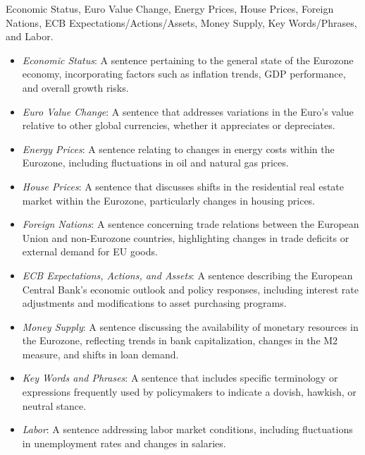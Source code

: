  Economic Status, Euro Value Change, Energy Prices, House Prices, Foreign Nations, ECB Expectations/Actions/Assets, Money Supply, Key Words/Phrases, and Labor.

\begin{itemize} 
    \item \emph{Economic Status}: A sentence pertaining to the general state of the Eurozone economy, incorporating factors such as inflation trends, GDP performance, and overall growth risks. 
    \item \emph{Euro Value Change}: A sentence that addresses variations in the Euro's value relative to other global currencies, whether it appreciates or depreciates. 
    \item \emph{Energy Prices}: A sentence relating to changes in energy costs within the Eurozone, including fluctuations in oil and natural gas prices. 
    \item \emph{House Prices}: A sentence that discusses shifts in the residential real estate market within the Eurozone, particularly changes in housing prices. 
    \item \emph{Foreign Nations}: A sentence concerning trade relations between the European Union and non-Eurozone countries, highlighting changes in trade deficits or external demand for EU goods. 
    \item \emph{ECB Expectations, Actions, and Assets}: A sentence describing the European Central Bank's economic outlook and policy responses, including interest rate adjustments and modifications to asset purchasing programs. 
    \item \emph{Money Supply}: A sentence discussing the availability of monetary resources in the Eurozone, reflecting trends in bank capitalization, changes in the M2 measure, and shifts in loan demand. 
    \item \emph{Key Words and Phrases}: A sentence that includes specific terminology or expressions frequently used by policymakers to indicate a dovish, hawkish, or neutral stance. 
    \item \emph{Labor}: A sentence addressing labor market conditions, including fluctuations in unemployment rates and changes in salaries. 
\end{itemize}


